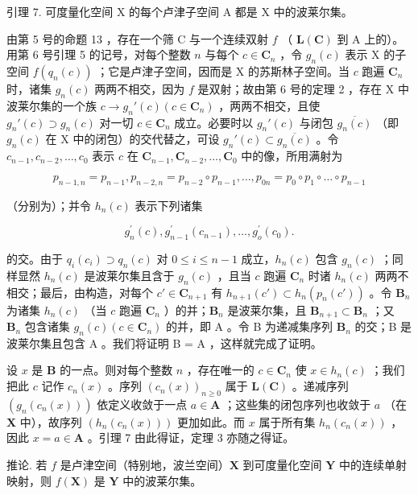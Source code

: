 引理 7. 可度量化空间 X 的每个卢津子空间 A 都是 X 中的波莱尔集。

由第 5 号的命题 13 ，存在一个筛 C 与一个连续双射 \(f\) （ \(\mathbf{L}(\mathbf{C})\) 到 A 上的）。用第 6 号引理 5 的记号，对每个整数 \(n\) 与每个 \(c \in \mathbf{C}_n\) ，令 \(g_n(c)\) 表示 X 的子空间 \(f(q_n(c))\) ；它是卢津子空间，因而是 X 的苏斯林子空间。当 \(c\) 跑遍 \(\mathbf{C}_n\) 时，诸集 \(g_n(c)\) 两两不相交，因为 \(f\) 是双射；故由第 6 号的定理 2 ，存在 X 中波莱尔集的一个族 \(c \to g_n'(c) (c \in \mathbf{C}_n)\) ，两两不相交，且使 \(g_n'(c) \supset g_n(c)\) 对一切 \(c \in \mathbf{C}_n\) 成立。必要时以 \(g_n'(c)\) 与闭包 \(\overline{g_n(c)}\) （即 \(g_n(c)\) 在 X 中的闭包）的交代替之，可设 \(g_n'(c) \subset \overline{g_n(c)}\) 。令 \(c_{n-1}, c_{n-2}, \ldots, c_0\) 表示 \(c\) 在 \(\mathbf{C}_{n-1}, \mathbf{C}_{n-2}, \ldots, \mathbf{C}_0\) 中的像，所用满射为

\[
p _ {n - 1, n} = p _ {n - 1}, p _ {n - 2, n} = p _ {n - 2} \circ p _ {n - 1}, \dots , p _ {0 n} = p _ {0} \circ p _ {1} \circ \dots \circ p _ {n - 1}
\]

（分别为）；并令 \(h_n(c)\) 表示下列诸集

\[
g _ {n} ^ {\prime} (c), g _ {n - 1} ^ {\prime} \left(c _ {n - 1}\right), \dots , g _ {o} ^ {\prime} \left(c _ {0}\right).
\]

的交。由于 \(q_{i}(c_{i}) \supset q_{n}(c)\) 对 \(0 \leqslant i \leqslant n - 1\) 成立，\(h_{n}(c)\) 包含 \(g_{n}(c)\) ；同样显然 \(h_{n}(c)\) 是波莱尔集且含于 \(g_{n}(c)\) ，且当 \(c\) 跑遍 \(\mathbf{C}_{n}\) 时诸 \(h_{n}(c)\) 两两不相交；最后，由构造，对每个 \(c' \in \mathbf{C}_{n+1}\) 有 \(h_{n+1}(c') \subset h_n(p_n(c'))\) 。令 \(\mathbf{B}_n\) 为诸集 \(h_n(c)\) （当 \(c\) 跑遍 \(\mathbf{C}_n\) ）的并；\(\mathbf{B}_n\) 是波莱尔集，且 \(\mathbf{B}_{n+1} \subset \mathbf{B}_n\) ；又 \(\mathbf{B}_n\) 包含诸集 \(g_n(c) (c \in \mathbf{C}_n)\) 的并，即 A 。令 B 为递减集序列 \(\mathbf{B}_n\) 的交；B 是波莱尔集且包含 A 。我们将证明 B = A ，这样就完成了证明。

设 \(x\) 是 \(\mathbf{B}\) 的一点。则对每个整数 \(n\) ，存在唯一的 \(c \in \mathbf{C}_n\) 使 \(x \in h_n(c)\) ；我们把此 \(c\) 记作 \(c_n(x)\) 。序列 \((c_n(x))_{n \geqslant 0}\) 属于 \(\mathbf{L}(\mathbf{C})\) 。递减序列 \((g_n(c_n(x)))\) 依定义收敛于一点 \(a \in \mathbf{A}\) ；这些集的闭包序列也收敛于 \(a\) （在 \(\mathbf{X}\) 中），故序列 \((h_n(c_n(x)))\) 更加如此。而 \(x\) 属于所有集 \(h_n(c_n(x))\) ，因此 \(x = a \in \mathbf{A}\) 。引理 7 由此得证，定理 3 亦随之得证。

推论. 若 \(f\) 是卢津空间（特别地，波兰空间）\(\mathbf{X}\) 到可度量化空间 \(\mathbf{Y}\) 中的连续单射映射，则 \(f(\mathbf{X})\) 是 \(\mathbf{Y}\) 中的波莱尔集。

